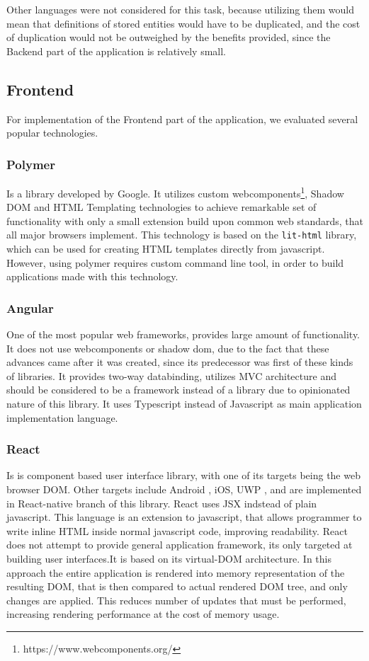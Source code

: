 Other languages were not considered for this task, because utilizing them would mean that definitions of stored entities
would have to be duplicated, and the cost of duplication would not be outweighed by the benefits provided, since
the Backend part of the application is relatively small.

\subsection{Frontend}
For implementation of the Frontend part of the application, we evaluated several popular technologies.

\subsubsection{Polymer}
Is a library developed by Google. It utilizes custom webcomponents\footnote{https://www.webcomponents.org/}, Shadow DOM and HTML Templating technologies
to achieve remarkable set of functionality with only a small extension build upon common web standards, that all major
browsers implement. This technology is based on the \verb|lit-html| library, which can be used for creating HTML templates directly from
javascript. However, using polymer requires custom command line tool, in order to build applications made with this technology.

\subsubsection{Angular}
One of the most popular web frameworks, provides large amount of functionality. It does not use webcomponents or shadow dom,
due to the fact that these advances came after it was created, since its predecessor was first of these kinds of libraries.
It provides two-way databinding, utilizes MVC architecture and should be considered to be a framework instead of a library
due to opinionated nature of this library. It uses Typescript instead of Javascript as main application implementation language.

\subsubsection{React}
Is is component based user interface library, with one of its targets being the web browser DOM. Other targets
include Android , iOS, UWP , and are implemented in React-native branch of this library. React uses
JSX indstead of plain javascript. This language is an extension to javascript, that allows programmer to write inline
HTML inside normal javascript code, improving readability. React does not attempt to provide general application framework,
its only targeted at building user interfaces.It is based on its virtual-DOM architecture. In this approach
the entire application is rendered into memory representation of the resulting DOM, that is then compared to actual rendered
DOM tree, and only changes are applied. This reduces number of updates that must be performed, increasing rendering performance
at the cost of memory usage.


